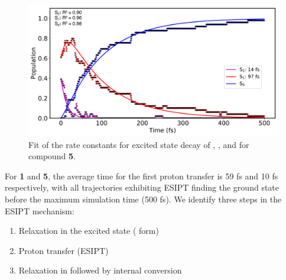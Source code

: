 \begin{figure}[H]
\centering
  \includegraphics[width=0.9\linewidth]{3nonradiativedecay/HC_5_states_dynamics_fit.pdf}
  \caption[Model of the state decay rates for \textbf{HC5}]{Fit of the rate constants for excited state decay of \stwo{}, \sone{}, and \szero{} for compound \textbf{5}.}
  \label{figure: HC_5_states_dynamics_fit}
\end{figure}


For \textbf{1} and \textbf{5}, the average time for the first proton transfer is 59 fs and 10 fs respectively, with all trajectories exhibiting ESIPT finding the ground state before the maximum simulation time (500 fs). We identify three steps in the ESIPT mechanism:
\begin{enumerate}
    \item Relaxation in the excited state (\Estar{} form)
    \item Proton transfer (ESIPT) 
    \item Relaxation in \Kstar{} followed by internal conversion
\end{enumerate}


